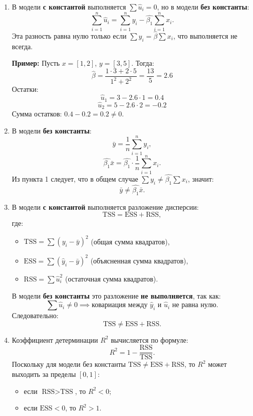 \documentclass[12pt]{article}
\begin{document}
\begin{sol}
\begin{enumerate}
    \item В модели \textbf{с константой} выполняется $\sum \hat{u}_i = 0$, но в модели \textbf{без константы}:
    \[ \sum_{i=1}^n \hat{u}_i = \sum_{i=1}^n y_i - \hat{\beta_1} \sum_{i=1}^n x_i. \]
    Эта разность равна нулю только если $\sum y_i = \hat{\beta} \sum x_i$, что выполняется не всегда.

    \textbf{Пример:}
    Пусть $x = [1, 2]$, $y = [3, 5]$. Тогда:
    \[ \hat{\beta} = \frac{1 \cdot 3 + 2 \cdot 5}{1^2 + 2^2} = \frac{13}{5} = 2.6 \]
    Остатки:
    \[ \hat{u}_1 = 3 - 2.6 \cdot 1 = 0.4 \]
    \[ \hat{u}_2 = 5 - 2.6 \cdot 2 = -0.2 \]
    Сумма остатков: $0.4 - 0.2 = 0.2 \neq 0$.

    \item В модели \textbf{без константы}:
    \[ \bar{y} = \frac{1}{n} \sum_{i=1}^n y_i, \]
    \[ \hat{\beta_1} \bar{x} = \hat{\beta_1} \cdot \frac{1}{n} \sum_{i=1}^n x_i. \]
    Из пункта 1 следует, что в общем случае $\sum y_i \neq \hat{\beta_1} \sum x_i$, значит:
    \[ \bar{y} \neq \hat{\beta_1} \bar{x}. \]

    \item В модели \textbf{с константой} выполняется разложение дисперсии:
    \[ \text{TSS} = \text{ESS} + \text{RSS}, \]
    где:
    \begin{itemize}
        \item $\text{TSS} = \sum (y_i - \bar{y})^2$ (общая сумма квадратов),
        \item $\text{ESS} = \sum (\hat{y}_i - \bar{y})^2$ (объясненная сумма квадратов),
        \item $\text{RSS} = \sum \hat{u}_i^2$ (остаточная сумма квадратов).
    \end{itemize}

    В модели \textbf{без константы} это разложение \textbf{не выполняется}, так как:
    \[ \sum \hat{u}_i \neq 0 \implies \text{ковариация между } \hat{y}_i \text{ и } \hat{u}_i \text{ не равна нулю}. \]
    Следовательно:
    \[ \text{TSS} \neq \text{ESS} + \text{RSS}. \]

    \item Коэффициент детерминации $R^2$ вычисляется по формуле:
    \[
    R^2 = 1 - \frac{\text{RSS}}{\text{TSS}}.
    \]
    Поскольку для модели без константы $\text{TSS} \neq \text{ESS} + \text{RSS}$, то $R^2$ может выходить за пределы $[0, 1]$:
    \begin{itemize}
        \item если $\text{RSS} > \text{TSS}$, то $R^2 < 0$;
        \item если $\text{ESS} < 0$, то $R^2 > 1$.
    \end{itemize}
\end{enumerate}
\end{sol}
\end{document}
